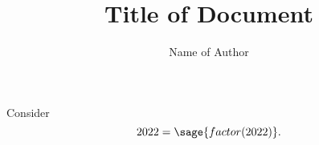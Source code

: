 \documentclass{article}
\title{Title of Document}
\author{Name of Author}
\begin{document}
\maketitle


Consider $$2022=\sage{factor(2022)}.$$
\end{document}
